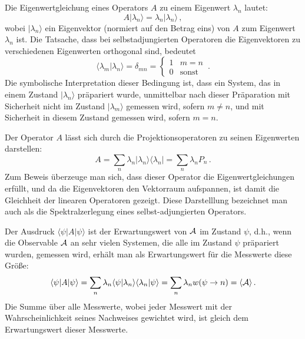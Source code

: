 Die Eigenwertgleichung eines Operators $A$ zu einem Eigenwert $\lambda_n$ lautet:
\begin{equation}
                                A | \lambda_n \rangle = \lambda_n | \lambda_n \rangle  \, , 
\end{equation}
wobei $|\lambda_n\rangle$ ein Eigenvektor (normiert auf den Betrag eins) von $A$ zum Eigenwert
$\lambda_n$ ist. Die Tatsache, dass bei selbstadjungierten Operatoren die Eigenvektoren
zu verschiedenen Eigenwerten orthogonal sind, bedeutet
\begin{equation}
                 \langle \lambda_m | \lambda_n \rangle = \delta_{mn} =
                 \left\{ \begin{array}{ll}  1 & m=n \\ 0 & \mbox{sonst}  \end{array} \right.  \, . 
\end{equation}
Die symbolische Interpretation dieser Bedingung ist, dass ein System, das in einem Zustand
$|\lambda_n\rangle$ pr\"apariert wurde, unmittelbar nach dieser Pr\"aparation mit Sicherheit 
nicht im Zustand $|\lambda_m\rangle$
gemessen wird, sofern $m\neq n$, und mit Sicherheit in diesem Zustand gemessen wird, sofern
$m=n$. 

Der Operator $A$ l\"asst sich durch die Projektionsoperatoren zu seinen Eigenwerten
darstellen:
\begin{equation}
\label{eq_Spektralzerlegung}
          A = \sum_n \lambda_n  | \lambda_n \rangle \langle \lambda_n |  = \sum_n \lambda_n P_n \, .
\end{equation}
Zum Beweis \"uberzeuge man sich, dass dieser Operator die Eigenwertgleichungen erf\"ullt, und
da die Eigenvektoren den Vektorraum aufspannen, ist damit die Gleichheit der linearen Operatoren
gezeigt. Diese Darstelllung bezeichnet man auch als die Spektralzerlegung eines selbst-adjungierten
Operators.

Der Ausdruck $\langle \psi |A| \psi \rangle$ ist der Erwartungswert von ${\cal A}$
im Zustand $\psi$, d.h., wenn die Observable
${\cal A}$ an sehr vielen Systemen, die alle im Zustand $\psi$ pr\"apariert wurden, gemessen wird,
erh\"alt man als Erwartungswert f\"ur die Messwerte diese Gr\"o\ss e:
\begin{equation}
     \langle \psi | A | \psi \rangle  
         = \sum_n \lambda_n  \langle \psi| \lambda_n \rangle \langle \lambda_n | \psi \rangle
         = \sum_n \lambda_n  w(\psi \rightarrow n)  = \langle {\cal A} \rangle \, .
\end{equation}
Die Summe \"uber alle Messwerte, wobei jeder Messwert mit der Wahrscheinlichkeit seines 
Nachweises gewichtet wird, ist gleich dem Erwartungswert dieser Messwerte. 

